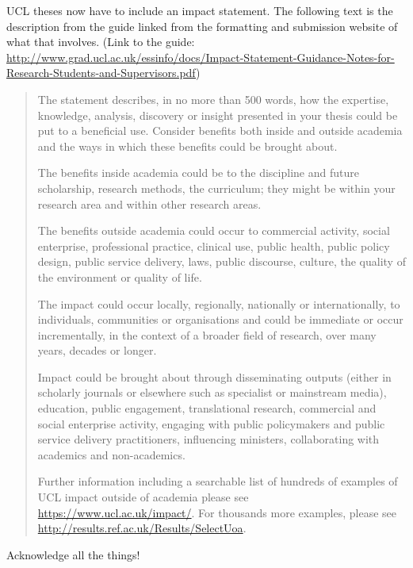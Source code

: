 \begin{impactstatement}

	UCL theses now have to include an impact statement. The following text is the description from the guide linked from the formatting and submission website of what that involves. (Link to the guide: {\scriptsize \url{http://www.grad.ucl.ac.uk/essinfo/docs/Impact-Statement-Guidance-Notes-for-Research-Students-and-Supervisors.pdf}})

	\begin{quote}
		The statement describes, in no more than 500 words, how the expertise, knowledge, analysis,
		discovery or insight presented in your thesis could be put to a beneficial use. Consider benefits both
		inside and outside academia and the ways in which these benefits could be brought about.

		The benefits inside academia could be to the discipline and future scholarship, research methods,
		the curriculum; they might be within your research area and within other
		research areas.

		The benefits outside academia could occur to commercial activity, social enterprise, professional
		practice, clinical use, public health, public policy design, public service delivery, laws, public
		discourse, culture, the quality of the environment or quality of life.

		The impact could occur locally, regionally, nationally or internationally, to individuals, communities or
		organisations and could be immediate or occur incrementally, in the context of a broader field of
		research, over many years, decades or longer.

		Impact could be brought about through disseminating outputs (either in scholarly journals or
		elsewhere such as specialist or mainstream media), education, public engagement, translational
		research, commercial and social enterprise activity, engaging with public policymakers and public
		service delivery practitioners, influencing ministers, collaborating with academics and non-academics.

		Further information including a searchable list of hundreds of examples of UCL impact outside of
		academia please see \url{https://www.ucl.ac.uk/impact/}. For thousands more examples, please see
		\url{http://results.ref.ac.uk/Results/SelectUoa}.
	\end{quote}
\end{impactstatement}

\begin{acknowledgements}
	Acknowledge all the things!
\end{acknowledgements}

\setcounter{tocdepth}{2}

\tableofcontents
\listoffigures
\listoftables
